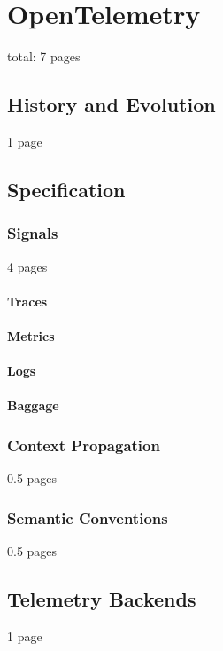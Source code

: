 \chapter{OpenTelemetry}
\label{chap:opentelemetry}

total: 7 pages

\section{History and Evolution}
\label{sec:o_history_and_evolution}

1 page

\section{Specification}
\label{sec:o_specification}

\subsection{Signals}
4 pages
\subsubsection{Traces}
\subsubsection{Metrics}
\subsubsection{Logs}
\subsubsection{Baggage}
\subsection{Context Propagation}

0.5 pages

\subsection{Semantic Conventions}

0.5 pages

\section{Telemetry Backends}

1 page

\label{sec:o_telemetry_backends}